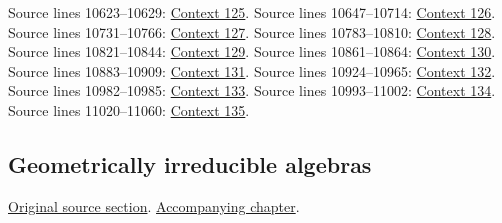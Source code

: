 \begin{AlgebraSourceRoutes}
 Source lines 10623--10629: \hyperlink{algebra-context-125}{Context 125}.
 Source lines 10647--10714: \hyperlink{algebra-context-126}{Context 126}.
 Source lines 10731--10766: \hyperlink{algebra-context-127}{Context 127}.
 Source lines 10783--10810: \hyperlink{algebra-context-128}{Context 128}.
 Source lines 10821--10844: \hyperlink{algebra-context-129}{Context 129}.
 Source lines 10861--10864: \hyperlink{algebra-context-130}{Context 130}.
 Source lines 10883--10909: \hyperlink{algebra-context-131}{Context 131}.
 Source lines 10924--10965: \hyperlink{algebra-context-132}{Context 132}.
 Source lines 10982--10985: \hyperlink{algebra-context-133}{Context 133}.
 Source lines 10993--11002: \hyperlink{algebra-context-134}{Context 134}.
 Source lines 11020--11060: \hyperlink{algebra-context-135}{Context 135}.
\end{AlgebraSourceRoutes}

\subsection{Geometrically irreducible algebras}
\hypertarget{algebra-source-section-algebras-over-fields}{}
\noindent\href{https://github.com/stacks/stacks-project/blob/a04446e57ec1fbc252a871afcec7752fb2807b14/algebra.tex\#L11073}{Original source section}. \href{algebra.pdf\#nameddest=section-algebras-over-fields}{Accompanying chapter}.


